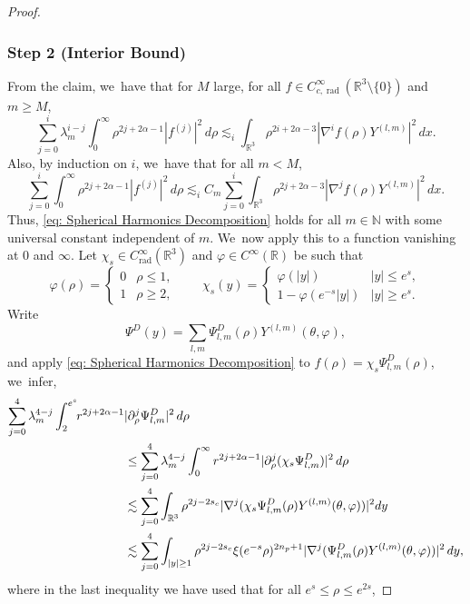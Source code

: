 \documentclass[10pt]{amsart}
\theoremstyle{plain}
\theoremstyle{definition}
\DeclareMathOperator{\rad}{rad}
\begin{document}
\begin{proof}
\subsubsection*{Step 2 (Interior Bound)}
From the claim, we~have that for $M$ large, for all $f\in C_{c,\rad}^\infty(\mathbb R^3\setminus \{0\})$ and $m\ge M$,
\[
\sum_{j=0}^i\lambda_m^{i-j}\int_0^\infty \rho^{2j+2\alpha-1}|f^{(j)}|^2\,d\rho\lesssim_i \int_{\mathbb R^3}\rho^{2i+2\alpha-3}|\nabla^i f(\rho)Y^{(l,m)}|^2\,dx.
\]
Also, by induction on $i$, we~have that for all $m<M$,
\begin{equation}
\label{eq: Spherical Harmonics Decomposition}
\sum_{j=0}^i\int_0^\infty \rho^{2j+2\alpha-1}|f^{(j)}|^2\,d\rho\lesssim_i C_m\sum_{j=0}^i\int_{\mathbb R^3}\rho^{2j+2\alpha-3}|\nabla^j f(\rho)Y^{(l,m)}|^2\,dx.
\end{equation}
Thus, \eqref{eq: Spherical Harmonics Decomposition} holds for all $m\in \mathbb N$ with some universal constant independent of $m$. We~now apply this to a function vanishing at $0$ and $\infty$. Let $\chi_s\in C^\infty_{\rad}(\mathbb R^3)$ and $\varphi\in C^\infty(\mathbb R)$ be such that
\[
\varphi(\rho)=
\begin{cases}
0 & \rho\le 1,\\ 1 & \rho\ge 2,
\end{cases}\qquad
\chi_s(y)=\begin{cases}
\varphi(|y|) & |y| \le e^s,\\
1-\varphi(e^{-s}|y|)& |y|\ge e^s.
\end{cases}
\]
Write
\[
\Psi^D(y)=\sum_{l,m} \Psi_{l,m}^D(\rho) Y^{(l,m)}(\theta,\varphi),
\]
and apply \eqref{eq: Spherical Harmonics Decomposition} to $f(\rho)=\chi_s\Psi_{l,m}^D(\rho)$, we~infer,
\[
\begin{aligned}
\sum_{j=0}^{4}\lambda_m^{4-j}\int_2^{e^s}\hspace*{-1mm} r^{2j+2\alpha-1}&|\partial_\rho^j \Psi_{l,m}^D|^2\,d\rho\\
&\le \sum_{j=0}^{4}\lambda_m^{4-j}\int_0^\infty r^{2j+2\alpha-1}|\partial_\rho^j(\chi_s \Psi_{l,m}^D)|^2\,d\rho\\
&\lesssim \sum_{j=0}^4\int_{\mathbb R^3} \rho^{2j-2s_c}|\nabla^j(\chi_s\Psi_{l,m}^D(\rho)Y^{(l,m)}(\theta,\varphi))|^2dy\\
&\lesssim \sum_{j=0}^4\int_{|y|\ge1}\rho^{2j-2s_c}\xi(e^{-s}\rho)^{2n_p+1}|\nabla^j(\Psi_{l,m}^D(\rho)Y^{(l,m)}(\theta,\varphi))|^2\,dy,
\end{aligned}
\]
where in the last inequality we have used that for all $e^s\le \rho\le e^{2s}$,

\end{proof}
\end{document}
